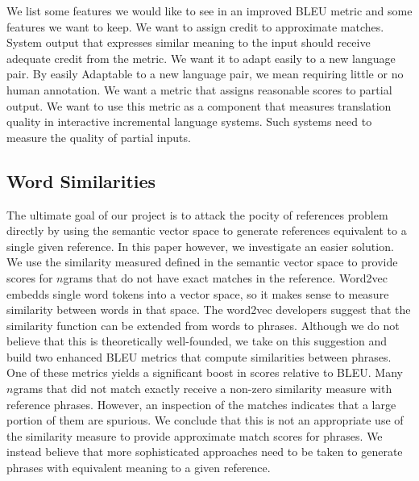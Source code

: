 We list some features we would like to see in an improved BLEU metric and some features we want to keep.  
We want to assign credit to approximate matches. 
System output that expresses similar meaning to the input should receive adequate credit from the metric. 
We want  it to adapt easily to a new language pair. 
By easily Adaptable to a new language pair, we mean requiring little or no human annotation. 
We want a metric that assigns reasonable scores to partial output. 
We want to use this metric as a component that measures translation quality in interactive incremental language systems. 
Such systems need to measure the quality of partial inputs. 


\subsection{Word Similarities}
\label{sec:wordsims}

The ultimate goal of our project is to attack the pocity of references problem directly by using the semantic vector space to generate references equivalent to a single given reference. 
In this paper however, we investigate an easier solution. 
We use the similarity measured defined in the semantic vector space to provide scores for $n$grams that do not have exact matches in the reference. 
Word2vec embedds single word tokens into a vector space, so it makes sense to measure similarity between words in that space. 
The word2vec developers suggest that the similarity function can be extended from words to phrases. 
Although we do not believe that this is theoretically  well-founded, we take on this suggestion and build two enhanced BLEU metrics that compute similarities between phrases. 
One of these metrics yields a significant boost in scores relative to BLEU. 
Many $n$grams that did not match exactly receive a non-zero similarity measure with reference phrases. 
However, an inspection of the matches indicates that a large portion of them are spurious. 
We conclude that this is not an appropriate use of the similarity measure to provide approximate match scores for phrases. 
We instead believe that more sophisticated approaches need to be taken to generate phrases with equivalent meaning to a given reference. 


